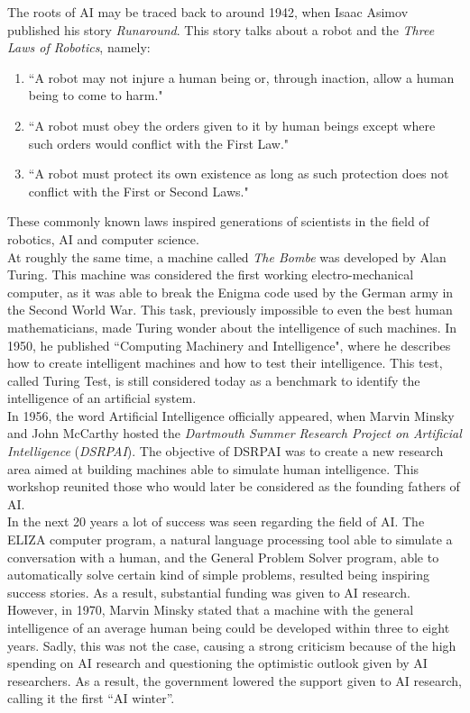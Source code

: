 The roots of AI may be traced back to around 1942, when Isaac Asimov published his story \textit{Runaround}. This story talks about a robot and the \textit{Three Laws of Robotics}, namely:
\begin{enumerate}
    \item ``A robot may not injure a human being or, through inaction, allow a human being to come to harm."
    \item ``A robot must obey the orders given to it by human beings except where such orders would conflict with the First Law."
    \item ``A robot must protect its own existence as long as such protection does not conflict with the First or Second Laws."
\end{enumerate}
These commonly known laws inspired generations of scientists in the field of robotics, AI and computer science.\\

At roughly the same time, a machine called \textit{The Bombe} was developed by Alan Turing. This machine was considered the first working electro-mechanical computer, as it was able to break the Enigma code used by the German army in the Second World War. This task, previously impossible to even the best human mathematicians, made Turing wonder about the intelligence of such machines. In 1950, he published ``Computing Machinery and Intelligence", where he describes how to create intelligent machines and how to test their intelligence. This test, called Turing Test, is still considered today as a benchmark to identify the intelligence of an artificial system.\\

In 1956, the word Artificial Intelligence officially appeared, when Marvin Minsky and John McCarthy hosted the \textit{Dartmouth Summer Research Project on Artificial Intelligence} (\textit{DSRPAI}). The objective of DSRPAI was to create a new research area aimed at building machines able to simulate human intelligence. This workshop reunited those who would later be considered as the founding fathers of AI.\\

In the next 20 years a lot of success was seen regarding the field of AI. The ELIZA computer program, a natural language processing tool able to simulate a conversation with a human, and the General Problem Solver program, able to automatically solve certain kind of simple problems, resulted being inspiring success stories. As a result, substantial funding was given to AI research. However, in 1970, Marvin Minsky stated that a machine with the general intelligence of an average human being could be developed within three to eight years. Sadly, this was not the case, causing a strong criticism because of the high spending on AI research and questioning the optimistic outlook given by AI researchers. As a result, the government lowered the support given to AI research, calling it the first ``AI winter''.\\

